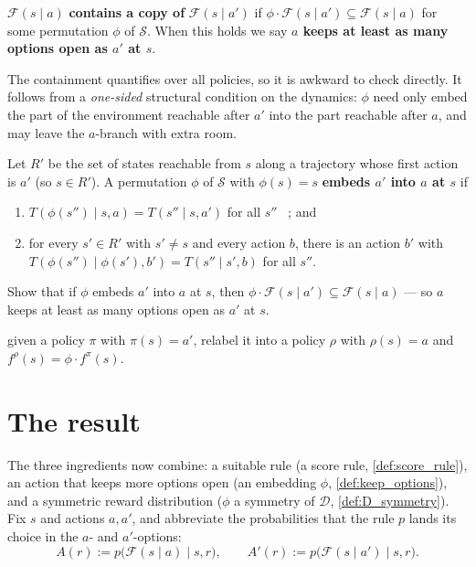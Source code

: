 \documentclass[11pt]{article}
\newcommand{\cS}{\mathcal{S}}
\newcommand{\Dist}{\mathcal{D}}    %
\newcommand{\F}{\mathcal{F}}       %
\begin{document}
\begin{definition}\label{def:keep_options}
$\F(s\mid a)$ \textbf{contains a copy of} $\F(s\mid a')$ if $\phi \cdot \F(s\mid a') \subseteq \F(s\mid a)$
for some permutation $\phi$ of $\cS$. When this holds we say \textbf{$a$ keeps at least as many
options open as $a'$ at $s$}.
\end{definition}


The containment quantifies over all policies, so it is awkward to check directly. It follows from a
\emph{one-sided} structural condition on the dynamics: $\phi$ need only embed the part of the
environment reachable after $a'$ into the part reachable after $a$, and may leave the $a$-branch
with extra room.

\begin{definition}\label{def:dyn_embedding}
Let $R'$ be the set of states reachable from $s$ along a trajectory whose first action is $a'$
(so $s \in R'$). A permutation $\phi$ of $\cS$ with $\phi(s) = s$ \textbf{embeds $a'$ into $a$
at $s$} if
\begin{enumerate}
  \item $T(\phi(s'') \mid s, a) = T(s'' \mid s, a')$ for all $s''$ \ ; and
  \item for every $s' \in R'$ with $s' \ne s$ and every action $b$, there is an action
  $b'$ with $T(\phi(s'') \mid \phi(s'), b') = T(s'' \mid s', b)$ for all $s''$.
\end{enumerate}
\end{definition}

\begin{exercise}
\label{prob:embedding_gives_copy} Show that if $\phi$ embeds $a'$ into $a$ at
$s$, then $\phi \cdot \F(s\mid a') \subseteq \F(s\mid a)$ --- so $a$ keeps at least as many
options open as $a'$ at $s$.
\end{exercise}
\begin{hint}
given a policy $\pi$ with $\pi(s)=a'$, relabel it into a policy $\rho$ with
$\rho(s)=a$ and $f^\rho(s) = \phi \cdot f^\pi(s)$.
\end{hint}


\section*{The result}

The three ingredients now combine: a suitable rule (a score rule, \cref{def:score_rule}), an action
that keeps more options open (an embedding $\phi$, \cref{def:keep_options}), and a symmetric reward
distribution ($\phi$ a symmetry of $\Dist$, \cref{def:D_symmetry}). Fix $s$ and actions $a,a'$, and
abbreviate the probabilities that the rule $p$ lands its choice in the $a$- and $a'$-options:
$$
A(r) := p\bigl(\F(s\mid a)\mid s,r\bigr), \qquad A'(r) := p\bigl(\F(s\mid a')\mid s,r\bigr).
$$
\end{document}
